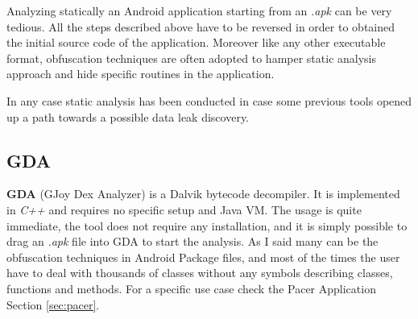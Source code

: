 	\par Analyzing statically an Android application starting from an \textit{.apk} can be very tedious. All the steps described above have to be reversed in order to obtained the initial source code of the application. Moreover like any other executable format, obfuscation techniques are often adopted to hamper static analysis approach and hide specific routines in the application. 
	\par In any case static analysis has been conducted in case some previous tools opened up a path towards a possible data leak discovery. 
	
		\subsection{GDA}
		\label{subsec:gda}
		\par \textbf{GDA} (GJoy Dex Analyzer) is a Dalvik bytecode decompiler. It is implemented in \textit{C++} and requires no specific setup and Java VM. The usage is quite immediate, the tool does not require any installation, and it is simply possible to drag an \textit{.apk} file into GDA to start the analysis. \newline 
	As I said many can be the obfuscation techniques in Android Package files, and most of the times the user have to deal with thousands of classes without any symbols describing classes, functions and methods.\newline
	For a specific use case check the Pacer Application Section \ref{sec:pacer}.

